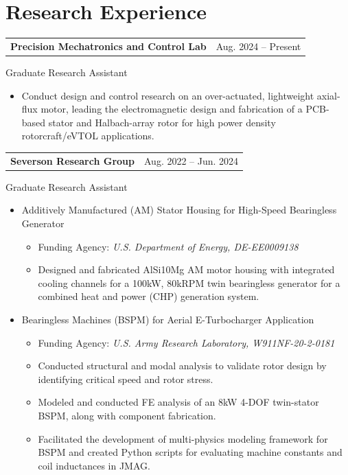 \section{\sc Research Experience}
\begin{tabular}{@{}p{4in}>{\raggedleft\arraybackslash}p{1.5in}}
{\bf Precision Mechatronics and Control Lab} & Aug. 2024 -- Present\\
\end{tabular}
Graduate Research Assistant
\begin{itemize}
\setlength\itemsep{0em}
\item Conduct design and control research on an over-actuated, lightweight axial-flux motor, leading the electromagnetic design and fabrication of a PCB-based stator and Halbach-array rotor for high power density rotorcraft/eVTOL applications.

\end{itemize}

\begin{tabular}{@{}p{4in}>{\raggedleft\arraybackslash}p{1.5in}}
{\bf Severson Research Group} & Aug. 2022 -- Jun. 2024\\
\end{tabular}
Graduate Research Assistant

\begin{itemize}
    \setlength\itemsep{0em}
    \item Additively Manufactured (AM) Stator Housing for High-Speed Bearingless Generator
    \begin{itemize}
        \item Funding Agency: \textit{U.S. Department of Energy, DE-EE0009138}
        \item Designed and fabricated AlSi10Mg AM motor housing with integrated cooling channels for a 100kW, 
        80kRPM twin bearingless generator for a combined heat and power (CHP) generation system.
    \end{itemize} 
    \item Bearingless Machines (BSPM) for Aerial E-Turbocharger Application
    \begin{itemize}
        \item Funding Agency: \textit{U.S. Army Research Laboratory, W911NF-20-2-0181}
        \item Conducted structural and modal analysis to validate rotor design by identifying critical speed and rotor stress.
        \item Modeled and conducted FE analysis of an 8kW 4-DOF twin-stator BSPM, along with component fabrication.
        \item Facilitated the development of multi-physics modeling framework for BSPM and created Python scripts for evaluating machine constants and coil inductances in JMAG.
    \end{itemize} 
\end{itemize}


